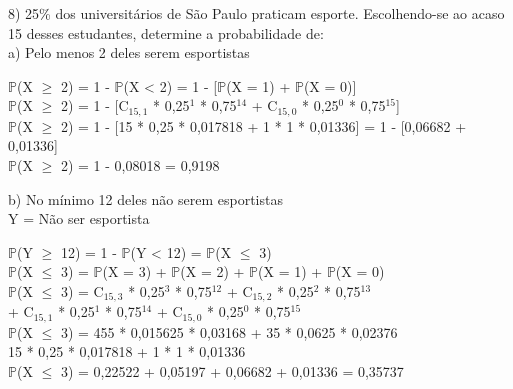 \documentclass[12pt,a4paper]{article}
\begin{document}
	\vspace{1cm}
	8) 25\% dos universitários de São Paulo praticam esporte. Escolhendo-se ao acaso 15 desses estudantes, determine a probabilidade de:\\
	a) Pelo menos 2 deles serem esportistas
	\begin{center}
		\vspace{0.5cm}
		$\mathbb{P}$(X $\geq$ 2) = 1 - $\mathbb{P}$(X < 2) = 1 - [$\mathbb{P}$(X = 1) + $\mathbb{P}$(X = 0)]
		\vspace{0.25cm}\\
		$\mathbb{P}$(X $\geq$ 2) = 1 - [C$_{15, 1}$ * 0,25$^1$ * 0,75$^{14}$ + C$_{15, 0}$ * 0,25$^0$ * 0,75$^{15}$]	
		\vspace{0.25cm}\\
		$\mathbb{P}$(X $\geq$ 2) = 1 - [15 * 0,25 * 0,017818 + 1 * 1 * 0,01336] = 1 - [0,06682 + 0,01336]
		\vspace{0.25cm}\\
		$\mathbb{P}$(X $\geq$ 2) =	1 - 0,08018 = 0,9198
	\end{center}
	\vspace{1cm}
	b) No mínimo 12 deles não serem esportistas
	\vspace{0.5cm}\\
	Y = Não ser esportista
	\begin{center}
		\vspace{0.5cm}
		$\mathbb{P}$(Y $\geq$ 12) = 1 - $\mathbb{P}$(Y < 12) = $\mathbb{P}$(X $\leq$ 3)
		\vspace{0.75cm}\\
		$\mathbb{P}$(X $\leq$ 3) = $\mathbb{P}$(X = 3) + $\mathbb{P}$(X = 2) + $\mathbb{P}$(X = 1) + $\mathbb{P}$(X = 0)
		\vspace{0.25cm}\\
		$\mathbb{P}$(X $\leq$ 3) = C$_{15, 3}$ * 0,25$^3$ * 0,75$^{12}$ + C$_{15, 2}$ * 0,25$^2$ * 0,75$^{13}$\\ + C$_{15, 1}$ * 0,25$^1$ * 0,75$^{14}$ + C$_{15, 0}$ * 0,25$^0$ * 0,75$^{15}$
		\vspace{0.25cm}\\
		$\mathbb{P}$(X $\leq$ 3) = 455 * 0,015625 * 0,03168 + 35 * 0,0625 * 0,02376\\ 15 * 0,25 * 0,017818 + 1 * 1 * 0,01336
		\vspace{0.25cm}\\
		$\mathbb{P}$(X $\leq$ 3) = 0,22522 + 0,05197 + 0,06682 + 0,01336 = 0,35737
	\end{center}
\end{document}
